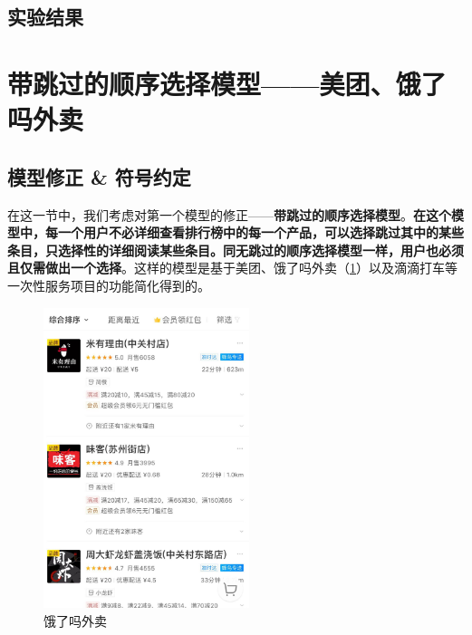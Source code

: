 \documentclass[UTF8]{ctexart}
\theoremstyle{plain}
\theoremstyle{definition}
\theoremstyle{remark}
\begin{document}
	\subsection{实验结果}
	\section{带跳过的顺序选择模型——美团、饿了吗外卖}
	\subsection{模型修正 \& 符号约定}
	在这一节中，我们考虑对第一个模型的修正——\textbf{带跳过的顺序选择模型}。\textbf{在这个模型中，每一个用户不必详细查看排行榜中的每一个产品，可以选择跳过其中的某些条目，只选择性的详细阅读某些条目。同无跳过的顺序选择模型一样，用户也必须且仅需做出一个选择}。这样的模型是基于美团、饿了吗外卖（\ref{modelB_fig_1}）以及滴滴打车等一次性服务项目的功能简化得到的。
	\begin{figure}[H] 
		\centering
		\includegraphics[width = 6cm]{modelB_fig_1.jpg}
		\caption{饿了吗外卖}\label{modelB_fig_1}
	\end{figure}
	
\end{document}
